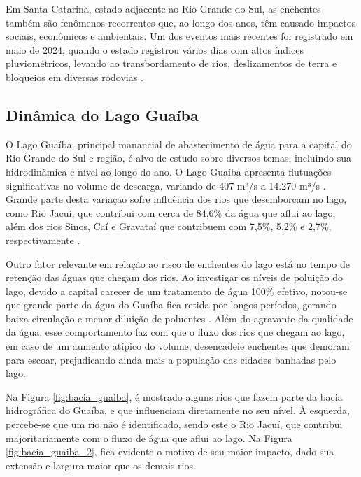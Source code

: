 Em Santa Catarina, estado adjacente ao Rio Grande do Sul, as enchentes também são fenômenos recorrentes que, ao longo dos anos, têm causado impactos sociais, econômicos e ambientais. Um dos eventos mais recentes foi registrado em maio de 2024, quando o estado registrou vários dias com altos índices pluviométricos, levando ao transbordamento de rios, deslizamentos de terra e bloqueios em diversas rodovias \cite{g12024}.

\subsection{Dinâmica do Lago Guaíba}

O Lago Guaíba, principal manancial de abastecimento de água para a capital do Rio Grande do Sul e região, é alvo de estudo sobre diversos temas, incluindo sua hidrodinâmica e nível ao longo do ano. O Lago Guaíba apresenta flutuações significativas no volume de descarga, variando de 407 m³/s a 14.270 m³/s \cite{andrade2017}. Grande parte desta variação sofre influência dos rios que desemborcam no lago, como Rio Jacuí, que contribui com cerca de 84,6\% da água que aflui ao lago, além dos rios Sinos, Caí e Gravataí que contribuem com 7,5\%, 5,2\% e 2,7\%, respectivamente \cite{andrade2019}. 

Outro fator relevante em relação ao risco de enchentes do lago está no tempo de retenção das águas que chegam dos rios. Ao investigar os níveis de poluição do lago, devido a capital carecer de um tratamento de água 100\% efetivo, notou-se que grande parte da água do Guaíba fica retida por longos períodos, gerando baixa circulação e menor diluição de poluentes \cite{andrade2019}. Além do agravante da qualidade da água, esse comportamento faz com que o fluxo dos rios que chegam ao lago, em caso de um aumento atípico do volume, desencadeie enchentes que demoram para escoar, prejudicando ainda mais a população das cidades banhadas pelo lago. 

Na Figura \ref{fig:bacia_guaiba}, é mostrado alguns rios que fazem parte da bacia hidrográfica do Guaíba, e que influenciam diretamente no seu nível. À esquerda, percebe-se que um rio não é identificado, sendo este o Rio Jacuí, que contribui majoritariamente com o fluxo de água que aflui ao lago. Na Figura \ref{fig:bacia_guaiba_2}, fica evidente o motivo de seu maior impacto, dado sua extensão e largura maior que os demais rios. 

